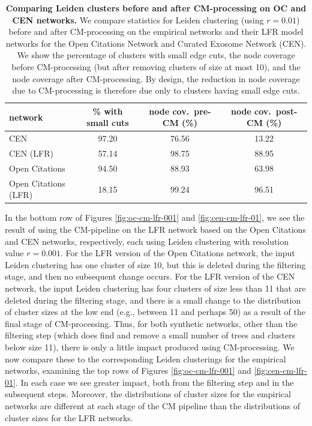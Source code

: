 \documentclass[11pt]{article}   	%
\begin{document}
\begin{table}[ht]
\centering
\begin{tabular}{lccc}
  \hline
 network & \% with small cuts & node cov.~pre-CM (\%) & node cov.~post-CM (\%) \\
   \hline
   CEN  &97.20 &76.56 &13.22 \\
   CEN (LFR) & 57.14& 98.75 & 88.95\\
   \hline
   Open Citations  &94.50&88.93&63.98 \\
   Open Citations (LFR) &18.15&99.24&96.51\\
   \hline
\end{tabular}
\caption{\textbf{Comparing Leiden clusters before and after CM-processing  on   OC and CEN networks.} We compare statistics for Leiden clustering (using $r=0.01$) before and after CM-processing on the empirical networks and their LFR model
networks for the Open Citations Network and Curated Exosome Network (CEN). We show the percentage of clusters with small edge cuts, the node coverage before CM-processing (but after removing clusters of size at most 10), and the node coverage after CM-processing.  By design, the reduction in node coverage due to CM-processing  is therefore due only to clusters having small edge cuts.}
\label{tab:LFR-vs-empirical-OC-CEN}
\end{table}

In the bottom row of Figures \ref{fig:oc-cm-lfr-001} and  \ref{fig:cen-cm-lfr-01}, we see the result of using the CM-pipeline on the LFR network based on the Open Citations  and CEN networks, respectively, each using Leiden clustering with
resolution value $r=0.001$.
For the LFR version of the Open Citations network, the input Leiden clustering has one cluster of size 10, but this is deleted during the filtering stage, and then no subsequent change occurs.
For the LFR version of the CEN network, the input Leiden clustering has four clusters of size less than 11 that are  deleted during the filtering stage, and there is a small change to the distribution of cluster sizes at the low end (e.g., between 11 and perhaps 50) as a result of the final stage of CM-processing.
Thus, for both synthetic networks, other than the filtering step (which does find and remove a small number of trees and clusters below size 11), there is only a little
impact produced using CM-processing.
We now compare these to the corresponding Leiden clusterings for the empirical networks, examining the top rows of Figures \ref{fig:oc-cm-lfr-001} and  \ref{fig:cen-cm-lfr-01}.
In each case we see greater impact, both from the filtering step  and in the subsequent steps. Moreover, the distributions of cluster sizes for the empirical networks are different at each stage of the CM
pipeline than the distributions of cluster sizes for the LFR networks.
\end{document}
